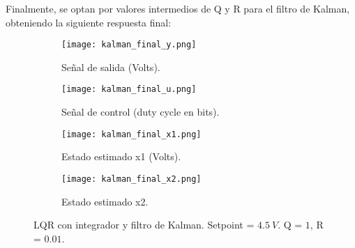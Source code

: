 Finalmente, se optan por valores intermedios de Q y R para el filtro de Kalman, obteniendo la siguiente respuesta final:

\begin{figure}[H]
    \centering

    \begin{subfigure}[b]{0.49\textwidth}
        \centering
        \texttt{[image: kalman\_final\_y.png]}
        \caption{Señal de salida (Volts).}
        \label{fig:kalman_final_y}
    \end{subfigure}
    \begin{subfigure}[b]{0.49\textwidth}
        \centering
        \texttt{[image: kalman\_final\_u.png]}
        \caption{Señal de control (duty cycle en bits).}
        \label{fig:kalman_final_u}
    \end{subfigure}

    \begin{subfigure}[b]{0.49\textwidth}
        \centering
        \texttt{[image: kalman\_final\_x1.png]}
        \caption{Estado estimado x1 (Volts).}
        \label{fig:kalman_final_x1}
    \end{subfigure}
    \begin{subfigure}[b]{0.49\textwidth}
        \centering
        \texttt{[image: kalman\_final\_x2.png]}
        \caption{Estado estimado x2.}
        \label{fig:kalman_final_x2}
    \end{subfigure}

    \vspace{-0.25cm}
    \caption{LQR con integrador y filtro de Kalman. Setpoint = $4.5\ V$. Q = $1$, R = $0.01$.}
    \label{fig:kalman_final}
\end{figure}
\vspace{-0.5cm}